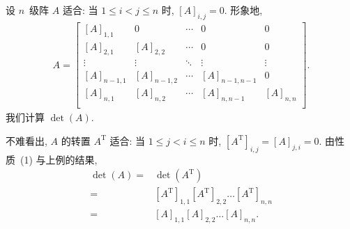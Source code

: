 \begin{example}
    设 \(n\)~级阵 \(A\) 适合:
    当 \(1 \leq i < j \leq n\) 时,
    \([A]_{i,j} = 0\).
    形象地,
    \begin{align*}
        A =
        \begin{bmatrix}
            [A]_{1,1}   & 0           & \cdots & 0             & 0         \\
            [A]_{2,1}   & [A]_{2,2}   & \cdots & 0             & 0         \\
            \vdots      & \vdots      & \ddots & \vdots        & \vdots    \\
            [A]_{n-1,1} & [A]_{n-1,2} & \cdots & [A]_{n-1,n-1} & 0         \\
            [A]_{n,1}   & [A]_{n,2}   & \cdots & [A]_{n,n-1}   & [A]_{n,n} \\
        \end{bmatrix}.
    \end{align*}
    我们计算 \(\det {(A)}\).

    不难看出, \(A\) 的转置 \(A^{\mathrm{T}}\) 适合:
    当 \(1 \leq j < i \leq n\) 时,
    \([A^{\mathrm{T}}]_{i,j} = [A]_{j,i} = 0\).
    由性质~(1) 与上例的结果,
    \begin{align*}
        \det {(A)}
        = {} &
        \det {(A^{\mathrm{T}})}
        \\
        = {} &
        [A^{\mathrm{T}}]_{1,1} [A^{\mathrm{T}}]_{2,2}
        \dots [A^{\mathrm{T}}]_{n,n}
        \\
        = {} &
        [A]_{1,1} [A]_{2,2} \dots [A]_{n,n}.
    \end{align*}
\end{example}

